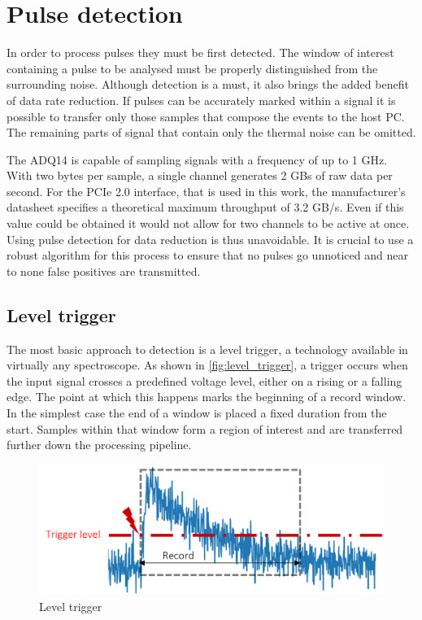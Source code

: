 \section{Pulse detection}
In order to process pulses they must be first detected. 
The window of interest containing a pulse to be analysed
must be properly distinguished from the surrounding noise.
Although detection is a must, it also brings the added benefit
of data rate reduction. If pulses can be accurately 
marked within a signal it is possible to transfer only
those samples that compose the events to the host PC. 
The remaining parts of signal that contain only the thermal noise
can be omitted.


The ADQ14 is capable of sampling signals with a frequency of
up to 1 GHz. With two bytes per sample, a single channel 
generates 2 GBs of raw data per second. For the PCIe 2.0 interface,
that is used in this work, the manufacturer's 
datasheet specifies a theoretical maximum throughput of 3.2 GB/s.
Even if this value could be obtained it would not allow 
for two channels to be active at once.
Using pulse detection for data reduction is thus unavoidable.
It is crucial to use a robust algorithm for this process to ensure 
that no pulses go unnoticed and near to none
false positives are transmitted.

\subsection{Level trigger}

The most basic approach to detection is a level trigger,
a technology available in virtually any spectroscope. As shown in 
\autoref{fig:level_trigger}, a trigger occurs when
the input signal crosses a predefined voltage level,
either on a rising or a falling edge. The point at which
this happens marks the beginning of a record window.
In the simplest case the end of a window is placed
a fixed duration from the start. Samples within that window
form a region of interest and are transferred further
down the processing pipeline.

\begin{figure}[H]
  \centering
  \includegraphics[width=.7\linewidth]{media/level_trigger.png}
  \caption{Level trigger}
  \label{fig:level_trigger}
\end{figure}


